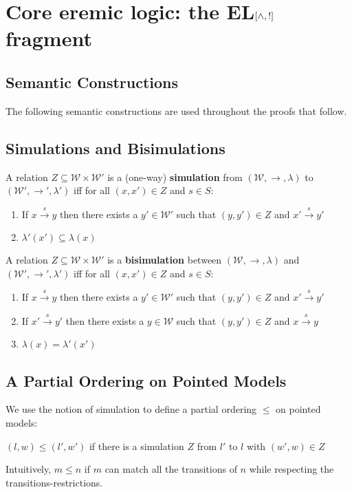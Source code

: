 \section{Core eremic logic: the EL$[\land, !]$ fragment}

\subsection{Semantic Constructions}
The following semantic constructions are used throughout the proofs that follow.
\subsection{Simulations and Bisimulations}

A relation $Z \subseteq \mathcal{W} \times \mathcal{W}'$ is a (one-way) {\bf simulation} from  $(\mathcal{W}, \rightarrow, \lambda)$ to $(\mathcal{W}', \rightarrow', \lambda')$ iff for all $(x,x') \in Z$ and $s \in S$:
\begin{enumerate}
\item
If $x \xrightarrow{s} y$ then there exists a $y' \in \mathcal{W}'$ such that $(y,y') \in Z$ and $x' \xrightarrow{s} y'$
\item
$\lambda'(x') \subseteq \lambda(x)$
\end{enumerate}
A relation $Z \subseteq \mathcal{W} \times \mathcal{W}'$ is a {\bf bisimulation} between  $(\mathcal{W}, \rightarrow, \lambda)$ and $(\mathcal{W}', \rightarrow', \lambda')$ iff for all $(x,x') \in Z$ and $s \in S$:
\begin{enumerate}
\item
If $x \xrightarrow{s} y$ then there exists a $y' \in \mathcal{W}'$ such that $(y,y') \in Z$ and $x' \xrightarrow{s} y'$
\item
If $x' \xrightarrow{s} y'$ then there exists a $y \in \mathcal{W}$ such that $(y,y') \in Z$ and $x \xrightarrow{s} y$
\item
$\lambda(x) = \lambda'(x')$
\end{enumerate}

\subsection{A Partial Ordering on Pointed Models}
We use the notion of simulation to define a partial ordering $\leq$ on pointed models:
\begin{definition}
$(l,w) \leq (l',w')$ if there is a simulation $Z$ from $l'$ to $l$ with $(w',w) \in Z$
\end{definition}
Intuitively, $m \leq n$ if $m$ can match all the transitions of $n$ while respecting the transitions-restrictions.

